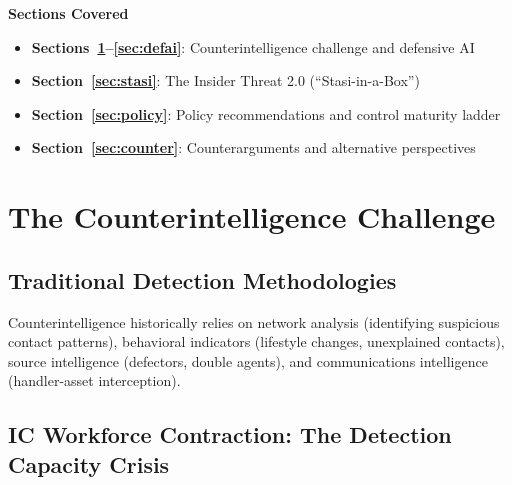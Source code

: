 \documentclass[11pt,letterpaper]{article}
\begin{document}
\vspace{0.8cm}
\begin{center}
\begin{minipage}{0.9\textwidth}
\begin{tcolorbox}[enhanced, colback=white, colframe=steelblue!40, boxrule=1pt, arc=4pt,
  left=15pt, right=15pt, top=12pt, bottom=12pt]
\textcolor{shadowdark}{\textbf{Sections Covered}}
\vspace{0.4em}
\begin{itemize}[nosep]
  \item \textbf{Sections~\ref{sec:ci}--\ref{sec:defai}}: Counterintelligence challenge and defensive AI
  \item \textbf{Section~\ref{sec:stasi}}: The Insider Threat 2.0 (``Stasi-in-a-Box'')
  \item \textbf{Section~\ref{sec:policy}}: Policy recommendations and control maturity ladder
  \item \textbf{Section~\ref{sec:counter}}: Counterarguments and alternative perspectives
\end{itemize}
\end{tcolorbox}
\end{minipage}
\end{center}


\section{The Counterintelligence Challenge}\label{sec:ci}

\subsection{Traditional Detection Methodologies}

Counterintelligence historically relies on network analysis (identifying suspicious contact patterns), behavioral indicators (lifestyle changes, unexplained contacts), source intelligence (defectors, double agents), and communications intelligence (handler-asset interception).

\subsection{IC Workforce Contraction: The Detection Capacity Crisis}
\end{document}
